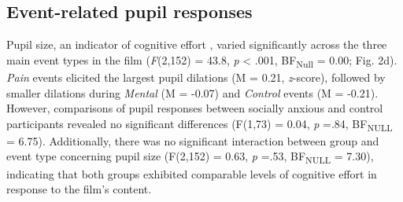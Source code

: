 \subsection*{Event-related pupil responses}
Pupil size, an indicator of cognitive effort \citep{beatty1982,burlingham2022}, varied significantly across the three main event types in the film (\textit{F}(2,152) = 43.8, \textit{p} < .001, BF\textsubscript{Null} = 0.00; Fig. 2d). \textit{Pain} events elicited the largest pupil dilations (M = 0.21, \textit{z}-score), followed by smaller dilations during \textit{Mental} (M = -0.07) and \textit{Control} events (M = -0.21). However, comparisons of pupil responses between socially anxious and control participants revealed no significant differences (F(1,73) = 0.04, \textit{p} =.84, BF\textsubscript{NULL} = 6.75). Additionally, there was no significant interaction between group and event type concerning pupil size (F(2,152) = 0.63, \textit{p} =.53, BF\textsubscript{NULL} = 7.30), indicating that both groups exhibited comparable levels of cognitive effort in response to the film's content.

